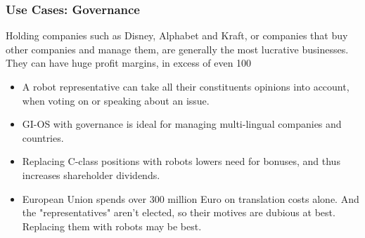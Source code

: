 \documentclass{beamer}
\begin{document}
\begin{frame}
  \frametitle{Use Cases: Governance}
  Holding companies such as Disney, Alphabet and Kraft, 
  or companies that buy other companies and manage them,
  are generally the most lucrative businesses. They can have huge profit
  margins, in excess of even 100%
  \begin{itemize}
    \item A robot representative can take all their constituents opinions 
          into account, when voting on or speaking about an issue.   
    \item GI-OS with governance is ideal for managing multi-lingual companies
          and countries. 
    \item Replacing C-class positions with robots lowers need for bonuses, and
          thus increases shareholder dividends. 
    \item European Union spends over 300 million Euro on translation costs
          alone. And the "representatives" aren't elected, so their motives are
          dubious at best. Replacing them with robots may be best.
  \end{itemize}
\end{frame}
\end{document}
